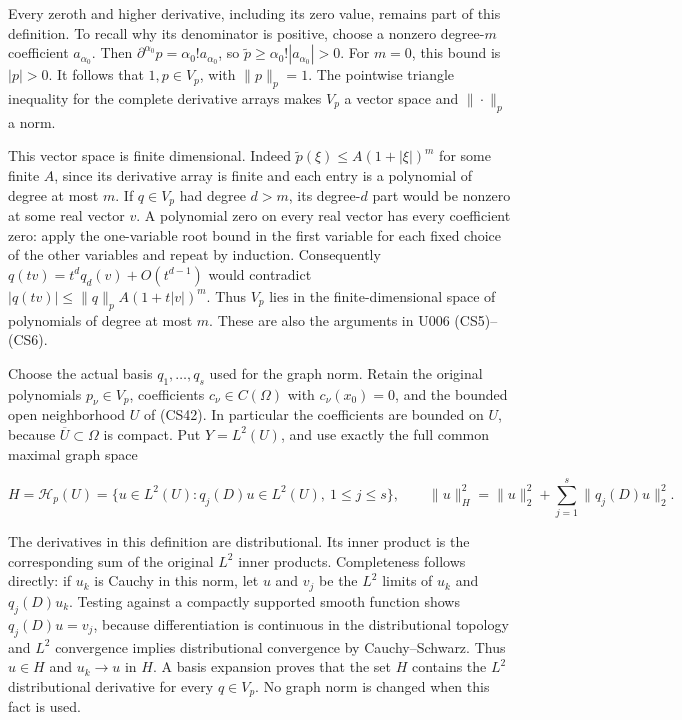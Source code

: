 \documentclass[
  11pt,
]{article}
\begin{document}
Every zeroth and higher derivative, including its zero value, remains
part of this definition. To recall why its denominator is positive,
choose a nonzero degree-\(m\) coefficient
\(a_{\alpha_0}\). Then \(\partial^{\alpha_0}p=\alpha_0!a_{\alpha_0}\), so
\(\widetilde p\geq\alpha_0!|a_{\alpha_0}|>0\). For \(m=0\), this bound
is \(|p|>0\). It follows that
\(1,p\in V_p\), with \(\|p\|_p=1\). The
pointwise triangle inequality for the complete derivative arrays makes
\(V_p\) a vector space and \(\|\cdot\|_p\)
a norm.

This vector space is finite dimensional. Indeed
\(\widetilde p(\xi)\leq A(1+|\xi|)^m\) for some finite \(A\),
since its derivative array is finite and each entry is a polynomial of
degree at most \(m\). If \(q\in V_p\)
had degree \(d>m\), its
degree-\(d\) part would be nonzero at some real
vector \(v\). A polynomial zero on every real
vector has every coefficient zero: apply the one-variable root bound in
the first variable for each fixed choice of the other variables and
repeat by induction. Consequently \(q(tv)=t^d q_d(v)+O(t^{d-1})\) would
contradict \(|q(tv)|\leq\|q\|_p A(1+t|v|)^m\). Thus \(V_p\)
lies in the finite-dimensional space of polynomials of degree at most
\(m\). These are also the arguments in U006
(CS5)--(CS6).

Choose the actual basis \(q_1,\ldots,q_s\) used for the graph
norm. Retain the original polynomials \(p_\nu\in V_p\),
coefficients \(c_\nu\in C(\Omega)\) with \(c_\nu(x_0)=0\),
and the bounded open neighborhood \(U\) of (CS42).
In particular the coefficients are bounded on
\(U\), because \(\overline U\subset\Omega\) is
compact. Put \(Y=L^2(U)\), and use exactly the full common
maximal graph space

\[
 H=\mathcal H_p(U)=\{u\in L^2(U):q_j(D)u\in L^2(U),\ 1\leq j\leq s\},
 \qquad
 \|u\|_H^2=\|u\|_2^2+\sum_{j=1}^s\|q_j(D)u\|_2^2.
 \tag{GM2}
\]

The derivatives in this definition are distributional. Its inner product
is the corresponding sum of the original \(L^2\)
inner products. Completeness follows directly: if
\(u_k\) is Cauchy in this norm, let
\(u\) and \(v_j\) be the
\(L^2\) limits of \(u_k\) and
\(q_j(D)u_k\). Testing against a compactly supported smooth
function shows \(q_j(D)u=v_j\), because differentiation is
continuous in the distributional topology and \(L^2\)
convergence implies distributional convergence by Cauchy--Schwarz. Thus
\(u\in H\) and \(u_k\to u\) in
\(H\). A basis expansion proves that the set
\(H\) contains the \(L^2\)
distributional derivative for every \(q\in V_p\). No graph
norm is changed when this fact is used.
\end{document}
